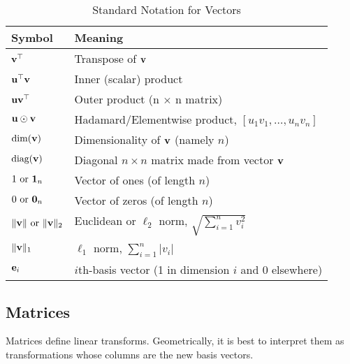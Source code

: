 \begin{table}[h!]
    \centering
    \begin{tabularx}{\textwidth}{@{}p{} X@{}}
        \toprule
        \textbf{Symbol}                       & \textbf{Meaning}                                           \\ \midrule
        $\mathbf{v}^\top$                         & Transpose of $\mathbf{v}$                                      \\
        $\mathbf{u}^\top \mathbf{v}$                  & Inner (scalar) product                                     \\
        $\mathbf{u} \mathbf{v}^\top$                  & Outer product (n $\times$ n matrix)                        \\
        $\mathbf{u} \odot \mathbf{v}$                 & Hadamard/Elementwise product, $[u_1 v_1, \ldots, u_n v_n]$ \\
        $\text{dim}(\mathbf{v})$                  & Dimensionality of $\mathbf{v}$ (namely $n$)                    \\
        $\text{diag}(\mathbf{v})$                 & Diagonal $n \times n$ matrix made from vector $\mathbf{v}$     \\
        $1 \text{ or } \mathbf{1}_n$              & Vector of ones (of length $n$)                             \\
        $0 \text{ or } \mathbf{0}_n$              & Vector of zeros (of length $n$)                            \\
        $\|\mathbf{v}\| \text{ or } \|\mathbf{v}\|_2$ & Euclidean or $\ell_2$ norm, $\sqrt{\sum_{i=1}^{n} v_i^2}$  \\
        $\|\mathbf{v}\|_1$                        & $\ell_1$ norm, $\sum_{i=1}^{n} |v_i|$                      \\
        $\mathbf{e}_i$                            & $i$th-basis vector (1 in dimension $i$ and 0 elsewhere)    \\ \bottomrule
    \end{tabularx}
    \caption{Standard Notation for Vectors}
\end{table}

\subsection{Matrices}

Matrices define linear transforms. Geometrically, it is best to interpret them as transformations whose columns are the new basis vectors.

